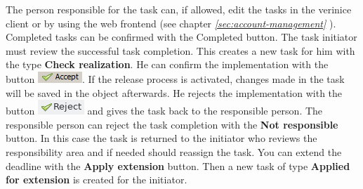 \documentclass[a4paper,10pt]{book}
\begin{document}
The person responsible for the task can, if allowed, edit the tasks in the verinice client or by using the web frontend
(see chapter {\em \ref{sec:account-management} }). Completed tasks can be confirmed with the Completed button. The task initiator must review the successful task completion.
This creates a new task for him with the type \textbf{Check realization}. He can confirm the implementation with the button \includegraphics[height=2ex]{Icon/Akzeptieren-en.png}. If the release process is activated, changes made in the task will be saved in the object afterwards.
He rejects the implementation with the button \includegraphics[height=2ex]{Icon/Reject.png} and gives the task back to the responsible person.
The responsible person can reject the task completion with the \textbf{Not responsible} button. In this case the task is returned to the initiator who reviews the responsibility area and if
needed should reassign the task. You can extend the deadline with the \textbf{Apply extension} button. Then a new task of type \textbf{Applied for extension} is created for the initiator.
\end{document}
